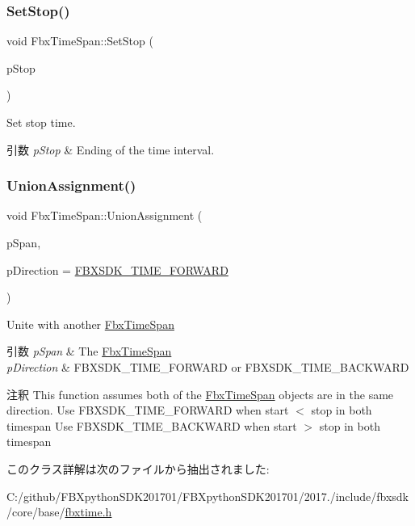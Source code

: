 \subsubsection{\texorpdfstring{Set\+Stop()}{SetStop()}}
{\footnotesize\ttfamily void Fbx\+Time\+Span\+::\+Set\+Stop (\begin{DoxyParamCaption}\item[{\hyperlink{class_fbx_time}{Fbx\+Time}}]{p\+Stop }\end{DoxyParamCaption})}

Set stop time. 
\begin{DoxyParams}{引数}
{\em p\+Stop} & Ending of the time interval. \\
\hline
\end{DoxyParams}
\mbox{\label{class_fbx_time_span_af5159fe30c3baa37728c12ac167a28ba}} 
\subsubsection{\texorpdfstring{Union\+Assignment()}{UnionAssignment()}}
{\footnotesize\ttfamily void Fbx\+Time\+Span\+::\+Union\+Assignment (\begin{DoxyParamCaption}\item[{const \hyperlink{class_fbx_time_span}{Fbx\+Time\+Span} \&}]{p\+Span,  }\item[{int}]{p\+Direction = {\ttfamily \hyperlink{fbxtime_8h_aa80e034e7196b05b47f7bc58a5e2ce49}{F\+B\+X\+S\+D\+K\+\_\+\+T\+I\+M\+E\+\_\+\+F\+O\+R\+W\+A\+RD}} }\end{DoxyParamCaption})}

Unite with another \hyperlink{class_fbx_time_span}{Fbx\+Time\+Span} 
\begin{DoxyParams}{引数}
{\em p\+Span} & The \hyperlink{class_fbx_time_span}{Fbx\+Time\+Span} \\
\hline
{\em p\+Direction} & F\+B\+X\+S\+D\+K\+\_\+\+T\+I\+M\+E\+\_\+\+F\+O\+R\+W\+A\+RD or F\+B\+X\+S\+D\+K\+\_\+\+T\+I\+M\+E\+\_\+\+B\+A\+C\+K\+W\+A\+RD \\
\hline
\end{DoxyParams}
\begin{DoxyRemark}{注釈}
This function assumes both of the \hyperlink{class_fbx_time_span}{Fbx\+Time\+Span} objects are in the same direction. Use F\+B\+X\+S\+D\+K\+\_\+\+T\+I\+M\+E\+\_\+\+F\+O\+R\+W\+A\+RD when start $<$ stop in both timespan Use F\+B\+X\+S\+D\+K\+\_\+\+T\+I\+M\+E\+\_\+\+B\+A\+C\+K\+W\+A\+RD when start $>$ stop in both timespan 
\end{DoxyRemark}


このクラス詳解は次のファイルから抽出されました\+:\begin{DoxyCompactItemize}
\item 
C\+:/github/\+F\+B\+Xpython\+S\+D\+K201701/\+F\+B\+Xpython\+S\+D\+K201701/2017./include/fbxsdk/core/base/\hyperlink{fbxtime_8h}{fbxtime.\+h}\end{DoxyCompactItemize}
